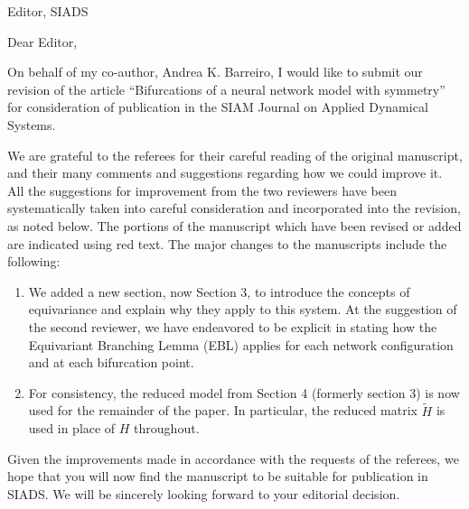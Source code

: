 \documentclass[11pt]{letter}
\begin{document}
\address{Ross Parker \\
Department of Mathematics \\
Southern Methodist University \\
Dallas, TX 75275 \\
\texttt{rhparker@smu.edu}}%
\signature{Ross Parker}
\begin{letter}{Editor, SIADS}

\opening{Dear Editor,}

On behalf of my co-author, Andrea K. Barreiro, I would like to submit our revision of the article ``Bifurcations of a neural network model with symmetry'' for consideration of publication in the SIAM Journal on Applied Dynamical Systems. 

We are grateful to the referees for their careful reading of the original manuscript, and their many comments and suggestions regarding how we could improve it. All the suggestions for improvement from the two reviewers have been systematically taken into careful consideration and incorporated into the revision, as noted below. The portions of the manuscript which have been revised or added are indicated using red text. The major changes to the manuscripts include the following:
\begin{enumerate}
\item We added a new section, now Section 3, to introduce the concepts of equivariance and explain why they apply to this system. At the suggestion of the second reviewer, we have endeavored to be explicit in stating how the Equivariant Branching Lemma (EBL) applies for each network configuration and at each bifurcation point.

    \item For consistency, the reduced model from Section 4 (formerly section 3) is now used for the remainder of the paper. In particular, the reduced matrix $\tilde{H}$ is used in place of $H$ throughout.
\end{enumerate}

Given the improvements made in accordance with the requests of the referees, we hope that you will now find the manuscript to be suitable for publication in SIADS. We will be sincerely looking forward to your editorial decision.


\end{letter}
\end{document}
